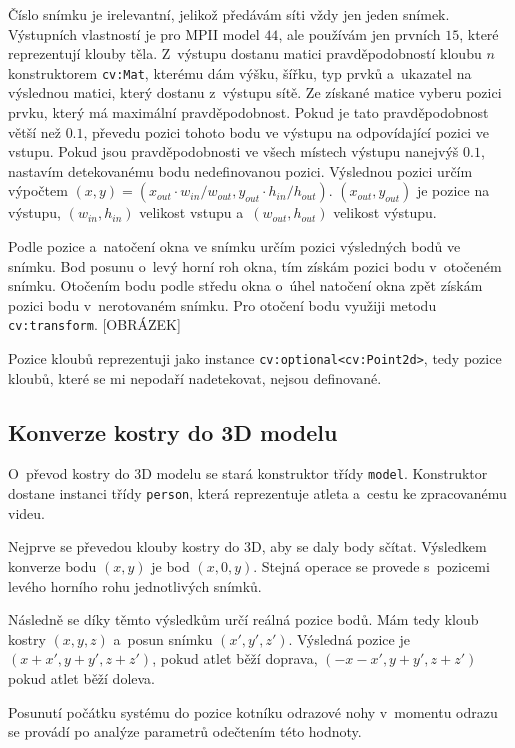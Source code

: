 Číslo snímku je irelevantní, jelikož předávám síti vždy jen jeden snímek. Výstupních vlastností je pro MPII model $44$, ale používám jen prvních $15$, které reprezentují klouby těla. Z~výstupu dostanu matici pravděpodobností kloubu $n$ konstruktorem \texttt{cv\::Mat}, kterému dám výšku, šířku, typ prvků a~ukazatel na výslednou matici, který dostanu z~výstupu sítě. Ze získané matice vyberu pozici prvku, který má maximální pravděpodobnost. Pokud je tato pravděpodobnost větší než $0.1$, převedu pozici tohoto bodu ve výstupu na odpovídající pozici ve vstupu. Pokud jsou pravděpodobnosti ve všech místech výstupu nanejvýš $0.1$, nastavím detekovanému bodu nedefinovanou pozici. Výslednou pozici určím výpočtem $(x,y)=(x_{out}\cdot w_{in}/w_{out}, y_{out}\cdot h_{in}/h_{out})$. $(x_{out},y_{out})$ je pozice na výstupu, $(w_{in},h_{in})$ velikost vstupu a~$(w_{out},h_{out})$ velikost výstupu.

Podle pozice a~natočení okna ve snímku určím pozici výsledných bodů ve snímku. Bod posunu o~levý horní roh okna, tím získám pozici bodu v~otočeném snímku. Otočením bodu podle středu okna o~úhel natočení okna zpět získám pozici bodu v~nerotovaném snímku. Pro otočení bodu využiji metodu \texttt{cv\::transform}. [OBRÁZEK]

Pozice kloubů reprezentuji jako instance \texttt{cv\::optional<cv\::Point2d>}, tedy pozice kloubů, které se mi nepodaří nadetekovat, nejsou definované.



\subsection{Konverze kostry do 3D modelu}

O~převod kostry do 3D modelu se stará konstruktor třídy \texttt{model}. Konstruktor dostane instanci třídy \texttt{person}, která reprezentuje atleta a~cestu ke zpracovanému videu.

Nejprve se převedou klouby kostry do 3D, aby se daly body sčítat. Výsledkem konverze bodu $(x,y)$ je bod $(x,0,y)$. Stejná operace se provede s~pozicemi levého horního rohu jednotlivých snímků.

Následně se díky těmto výsledkům určí reálná pozice bodů. Mám tedy kloub kostry $(x,y,z)$ a~posun snímku $(x',y',z')$. Výsledná pozice je $(x+x',y+y',z+z')$, pokud atlet běží doprava, $(-x-x',y+y',z+z')$ pokud atlet běží doleva.

Posunutí počátku systému do pozice kotníku odrazové nohy v~momentu odrazu se provádí po analýze parametrů odečtením této hodnoty.



